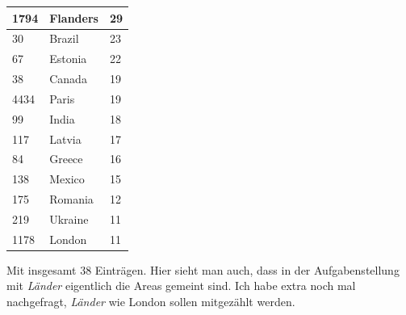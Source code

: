 \documentclass{article}
\begin{document}
\begin{center}
\begin{longtable}{l|l|l}
			1794 & Flanders & 29 \\ \hline
			30 & Brazil & 23 \\ \hline
			67 & Estonia & 22 \\ \hline
			38 & Canada & 19 \\ \hline
			4434 & Paris & 19 \\ \hline
			99 & India & 18 \\ \hline
			117 & Latvia & 17 \\ \hline
			84 & Greece & 16 \\ \hline
			138 & Mexico & 15 \\ \hline
			175 & Romania & 12 \\ \hline
			219 & Ukraine & 11 \\ \hline
			1178 & London & 11
		\end{longtable}
	\end{center}
	Mit insgesamt 38 Einträgen. Hier sieht man auch, dass in der Aufgabenstellung mit \textit{Länder} eigentlich die Areas gemeint sind. Ich habe extra noch mal nachgefragt, \textit{Länder} wie London sollen mitgezählt werden.
\end{document}
